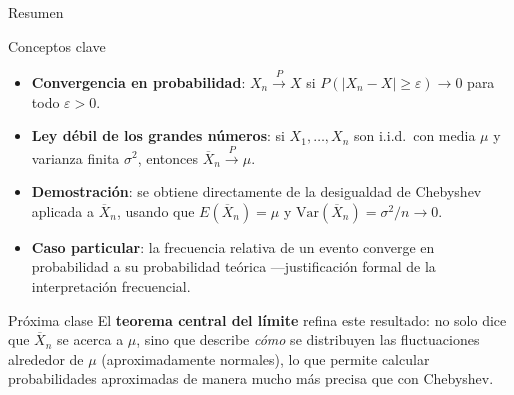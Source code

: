 \documentclass[aspectratio=169,11pt]{beamer}
\begin{document}
\begin{frame}{Resumen}
\begin{block}{Conceptos clave}
\begin{itemize}
\item \textbf{Convergencia en probabilidad}: $X_n \xrightarrow{P} X$ si $P(|X_n-X|\geq\varepsilon)\to 0$ para todo $\varepsilon>0$.
\item \textbf{Ley débil de los grandes números}: si $X_1,\dots,X_n$ son i.i.d.\ con media $\mu$ y varianza finita $\sigma^2$, entonces $\overline{X}_n \xrightarrow{P} \mu$.
\item \textbf{Demostración}: se obtiene directamente de la desigualdad de Chebyshev aplicada a $\overline{X}_n$, usando que $E(\overline{X}_n)=\mu$ y $\text{Var}(\overline{X}_n)=\sigma^2/n \to 0$.
\item \textbf{Caso particular}: la frecuencia relativa de un evento converge en probabilidad a su probabilidad teórica —justificación formal de la interpretación frecuencial.
\end{itemize}
\end{block}

\begin{alertblock}{Próxima clase}
El \textbf{teorema central del límite} refina este resultado: no solo dice que $\overline{X}_n$ se acerca a $\mu$, sino que describe \emph{cómo} se distribuyen las fluctuaciones alrededor de $\mu$ (aproximadamente normales), lo que permite calcular probabilidades aproximadas de manera mucho más precisa que con Chebyshev.
\end{alertblock}
\end{frame}
\end{document}
